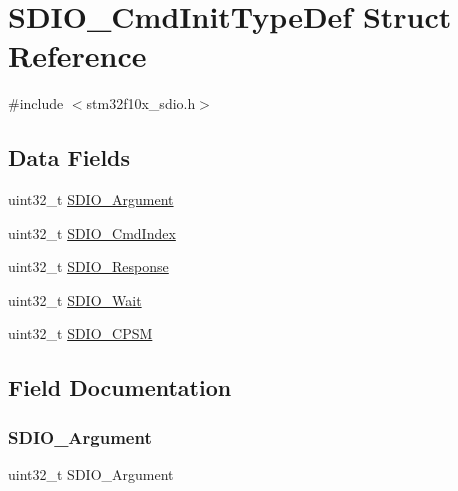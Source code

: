 \hypertarget{struct_s_d_i_o___cmd_init_type_def}{}\section{S\+D\+I\+O\+\_\+\+Cmd\+Init\+Type\+Def Struct Reference}
\label{struct_s_d_i_o___cmd_init_type_def}


{\ttfamily \#include $<$stm32f10x\+\_\+sdio.\+h$>$}

\subsection*{Data Fields}
\begin{DoxyCompactItemize}
\item 
uint32\+\_\+t \mbox{\hyperlink{struct_s_d_i_o___cmd_init_type_def_ab40e564f8fc0dcbf89ce34beb325d774}{S\+D\+I\+O\+\_\+\+Argument}}
\item 
uint32\+\_\+t \mbox{\hyperlink{struct_s_d_i_o___cmd_init_type_def_a8b55bd6b004ba9105f153e0147fbaa25}{S\+D\+I\+O\+\_\+\+Cmd\+Index}}
\item 
uint32\+\_\+t \mbox{\hyperlink{struct_s_d_i_o___cmd_init_type_def_aeff6d745f123c5f75fd094a856426aae}{S\+D\+I\+O\+\_\+\+Response}}
\item 
uint32\+\_\+t \mbox{\hyperlink{struct_s_d_i_o___cmd_init_type_def_afd47828b3053d2c3bf582fe8d092ab27}{S\+D\+I\+O\+\_\+\+Wait}}
\item 
uint32\+\_\+t \mbox{\hyperlink{struct_s_d_i_o___cmd_init_type_def_a67da149308b7fcafddd7b3d62513845f}{S\+D\+I\+O\+\_\+\+C\+P\+SM}}
\end{DoxyCompactItemize}


\subsection{Field Documentation}
\mbox{\label{struct_s_d_i_o___cmd_init_type_def_ab40e564f8fc0dcbf89ce34beb325d774}} 
\subsubsection{\texorpdfstring{SDIO\_Argument}{SDIO\_Argument}}
{\footnotesize\ttfamily uint32\+\_\+t S\+D\+I\+O\+\_\+\+Argument}

